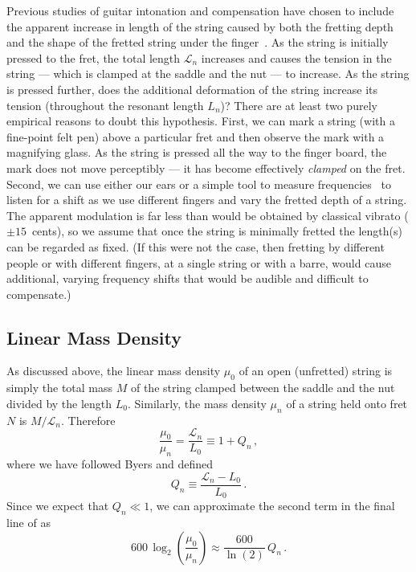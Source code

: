 Previous studies of guitar intonation and compensation have chosen to include the apparent increase in length of the string caused by both the fretting depth and the shape of the fretted string under the finger~\cite{ref:byers1996cgi,ref:varieschi2010icf}. As the string is initially pressed to the fret, the total length $\mathcal{L}_n$ increases and causes the tension in the string --- which is clamped at the saddle and the nut --- to increase. As the string is pressed further, does the additional deformation of the string increase its tension (throughout the resonant length $L_n$)? There are at least two purely empirical reasons to doubt this hypothesis. First, we can mark a string (with a fine-point felt pen) above a particular fret and then observe the mark with a magnifying glass. As the string is pressed all the way to the finger board, the mark does not move perceptibly --- it has become effectively \emph{clamped} on the fret. Second, we can use either our ears or a simple tool to measure frequencies~\cite{ref:pgtweb} to listen for a shift as we use different fingers and vary the fretted depth of a string. The apparent modulation is far less than would be obtained by classical vibrato ($\pm15$~cents), so we assume that once the string is minimally fretted the length(s) can be regarded as fixed. (If this were not the case, then fretting by different people or with different fingers, at a single string or with a barre, would cause additional, varying frequency shifts that would be audible and difficult to compensate.)

 \subsection{Linear Mass Density}
As discussed above, the linear mass density $\mu_0$ of an open (unfretted) string is simply the total mass $M$ of the string clamped between the saddle and the nut divided by the length $L_0$. Similarly, the mass density $\mu_n$ of a string held onto fret $N$ is $M/\mathcal{L}_n$. Therefore
 \begin{equation}
\frac{\mu_0}{\mu_n} = \frac{\mathcal{L}_n}{L_0} \equiv 1 + Q_n\, ,
 \end{equation}
where we have followed Byers and defined~\cite{ref:byers1996cgi,ref:varieschi2010icf}
 \begin{equation} \label{eqn:lambda_n_def}
Q_n \equiv \frac{\mathcal{L}_n - L_0}{L_0}\, .
 \end{equation}
Since we expect that $Q_n \ll 1$, we can approximate the second term in the final line of  as
 \begin{equation} \label{eqn:lmd_error}
600\, \log_2 \left(  \frac{\mu_0}{\mu_n} \right) \approx \frac{600}{\ln(2)}\, Q_n\, .
 \end{equation}

